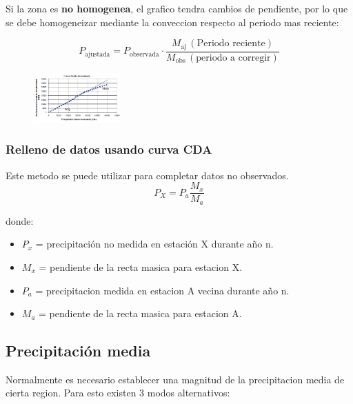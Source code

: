 Si la zona es \textbf{no homogenea}, el grafico tendra cambios de pendiente, por lo que se debe homogeneizar mediante la conveccion respecto al periodo mas reciente:

\begin{equation}
    P_{\text{ajustada}} = P_{\text{observada}} \cdot \frac{M_{\text{aj}} \, (\text{Periodo reciente})}{M_{\text{obs}} \, (\text{periodo a corregir})}
\end{equation}

\begin{figure}[H]
    \centering
    \includegraphics[width=0.3\textwidth]{imagenes/cda_no_homo.png}
    \label{cda_no_homo}
\end{figure}

\subsubsection{Relleno de datos usando curva CDA}

Este metodo se puede utilizar para completar datos no observados. \\

\begin{equation}
    P_X = P_a \frac{M_x}{M_a}
\end{equation}

donde: 
\begin{itemize}
    \item $P_x$ = precipitación no medida en estación X durante año n.
    \item $M_x$ = pendiente de la recta masica para estacion X.
    \item $P_a$ = precipitacion medida en estacion A vecina durante año n.
    \item $M_a$ = pendiente de la recta masica para estacion A.
\end{itemize}

\subsection{Precipitación media}

Normalmente es necesario establecer una magnitud de la precipitacion media de cierta region. Para esto existen 3 modos alternativos: \\

